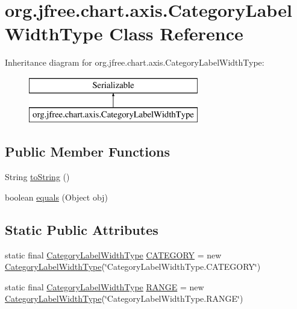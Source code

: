 \hypertarget{classorg_1_1jfree_1_1chart_1_1axis_1_1_category_label_width_type}{}\section{org.\+jfree.\+chart.\+axis.\+Category\+Label\+Width\+Type Class Reference}
\label{classorg_1_1jfree_1_1chart_1_1axis_1_1_category_label_width_type}
Inheritance diagram for org.\+jfree.\+chart.\+axis.\+Category\+Label\+Width\+Type\+:\begin{figure}[H]
\begin{center}
\leavevmode
\includegraphics[height=2.000000cm]{classorg_1_1jfree_1_1chart_1_1axis_1_1_category_label_width_type}
\end{center}
\end{figure}
\subsection*{Public Member Functions}
\begin{DoxyCompactItemize}
\item 
String \mbox{\hyperlink{classorg_1_1jfree_1_1chart_1_1axis_1_1_category_label_width_type_a60acf72c03824821b242a011149f43fc}{to\+String}} ()
\item 
boolean \mbox{\hyperlink{classorg_1_1jfree_1_1chart_1_1axis_1_1_category_label_width_type_a5760bfe04fc107513e3db4270102a463}{equals}} (Object obj)
\end{DoxyCompactItemize}
\subsection*{Static Public Attributes}
\begin{DoxyCompactItemize}
\item 
static final \mbox{\hyperlink{classorg_1_1jfree_1_1chart_1_1axis_1_1_category_label_width_type}{Category\+Label\+Width\+Type}} \mbox{\hyperlink{classorg_1_1jfree_1_1chart_1_1axis_1_1_category_label_width_type_a40e209b6656a7194ed5ec139312c8d72}{C\+A\+T\+E\+G\+O\+RY}} = new \mbox{\hyperlink{classorg_1_1jfree_1_1chart_1_1axis_1_1_category_label_width_type}{Category\+Label\+Width\+Type}}(\char`\"{}Category\+Label\+Width\+Type.\+C\+A\+T\+E\+G\+O\+RY\char`\"{})
\item 
static final \mbox{\hyperlink{classorg_1_1jfree_1_1chart_1_1axis_1_1_category_label_width_type}{Category\+Label\+Width\+Type}} \mbox{\hyperlink{classorg_1_1jfree_1_1chart_1_1axis_1_1_category_label_width_type_a18d5a40621b70aabe0bc2dd68a36684c}{R\+A\+N\+GE}} = new \mbox{\hyperlink{classorg_1_1jfree_1_1chart_1_1axis_1_1_category_label_width_type}{Category\+Label\+Width\+Type}}(\char`\"{}Category\+Label\+Width\+Type.\+R\+A\+N\+GE\char`\"{})
\end{DoxyCompactItemize}


